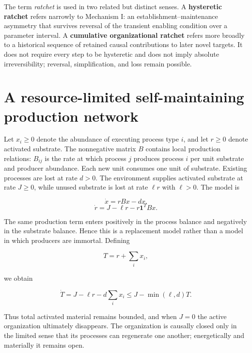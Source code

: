 \documentclass[11pt,a4paper]{article}
\begin{document}
The term \emph{ratchet} is used in two related but distinct senses. A \textbf{hysteretic ratchet} refers narrowly to Mechanism I: an establishment--maintenance asymmetry that survives reversal of the transient enabling condition over a parameter interval. A \textbf{cumulative organizational ratchet} refers more broadly to a historical sequence of retained causal contributions to later novel targets. It does not require every step to be hysteretic and does not imply absolute irreversibility; reversal, simplification, and loss remain possible.

\section{A resource-limited self-maintaining production
network}\label{a-resource-limited-self-maintaining-production-network}

Let \(x_i \geq 0\) denote the abundance of executing process type \(i\),
and let \(r \geq 0\) denote activated substrate. The nonnegative matrix
\(B\) contains local production relations: \(B_{ij}\) is the rate at
which process \(j\) produces process \(i\) per unit substrate and
producer abundance. Each new unit consumes one unit of substrate.
Existing processes are lost at rate \(d>0\). The environment supplies
activated substrate at rate \(J\geq0\), while unused substrate is lost at
rate \(\ell r\) with \(\ell>0\). The model is

\begin{equation}
\dot{x}=rBx-dx.
\label{eq:base-x}
\end{equation}
\begin{equation}
\dot r=J-\ell r-r\mathbf{1}^TBx.
\label{eq:base-r}
\end{equation}

The same production term enters positively in the process balance and
negatively in the substrate balance. Hence this is a replacement model
rather than a model in which producers are immortal. Defining

\[
T = r + \sum_i x_i,
\]

we obtain

\[
\dot{T} = J - \ell r - d\sum_i x_i \leq J - \min(\ell, d)T.
\]

Thus total activated material remains bounded, and when \(J = 0\) the
active organization ultimately disappears. The organization is causally
closed only in the limited sense that its processes can regenerate one
another; energetically and materially it remains open.
\end{document}
